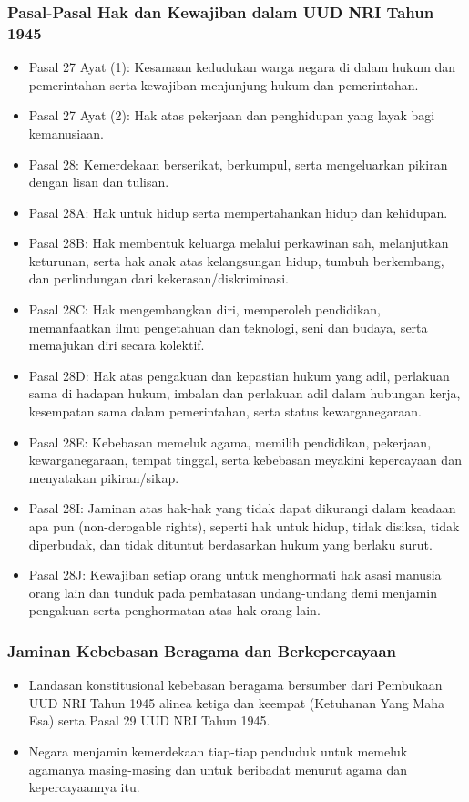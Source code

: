 \subsubsection{Pasal-Pasal Hak dan Kewajiban dalam UUD NRI Tahun 1945}
\begin{itemize}
\item Pasal 27 Ayat (1): Kesamaan kedudukan warga negara di dalam hukum dan pemerintahan serta kewajiban menjunjung hukum dan pemerintahan.
\item Pasal 27 Ayat (2): Hak atas pekerjaan dan penghidupan yang layak bagi kemanusiaan.
\item Pasal 28: Kemerdekaan berserikat, berkumpul, serta mengeluarkan pikiran dengan lisan dan tulisan.
\item Pasal 28A: Hak untuk hidup serta mempertahankan hidup dan kehidupan.
\item Pasal 28B: Hak membentuk keluarga melalui perkawinan sah, melanjutkan keturunan, serta hak anak atas kelangsungan hidup, tumbuh berkembang, dan perlindungan dari kekerasan/diskriminasi.
\item Pasal 28C: Hak mengembangkan diri, memperoleh pendidikan, memanfaatkan ilmu pengetahuan dan teknologi, seni dan budaya, serta memajukan diri secara kolektif.
\item Pasal 28D: Hak atas pengakuan dan kepastian hukum yang adil, perlakuan sama di hadapan hukum, imbalan dan perlakuan adil dalam hubungan kerja, kesempatan sama dalam pemerintahan, serta status kewarganegaraan.
\item Pasal 28E: Kebebasan memeluk agama, memilih pendidikan, pekerjaan, kewarganegaraan, tempat tinggal, serta kebebasan meyakini kepercayaan dan menyatakan pikiran/sikap.
\item Pasal 28I: Jaminan atas hak-hak yang tidak dapat dikurangi dalam keadaan apa pun (non-derogable rights), seperti hak untuk hidup, tidak disiksa, tidak diperbudak, dan tidak dituntut berdasarkan hukum yang berlaku surut.
\item Pasal 28J: Kewajiban setiap orang untuk menghormati hak asasi manusia orang lain dan tunduk pada pembatasan undang-undang demi menjamin pengakuan serta penghormatan atas hak orang lain.
\end{itemize}

\subsubsection{Jaminan Kebebasan Beragama dan Berkepercayaan}
\begin{itemize}
\item Landasan konstitusional kebebasan beragama bersumber dari Pembukaan UUD NRI Tahun 1945 alinea ketiga dan keempat (Ketuhanan Yang Maha Esa) serta Pasal 29 UUD NRI Tahun 1945.
\item Negara menjamin kemerdekaan tiap-tiap penduduk untuk memeluk agamanya masing-masing dan untuk beribadat menurut agama dan kepercayaannya itu.
\end{itemize}
